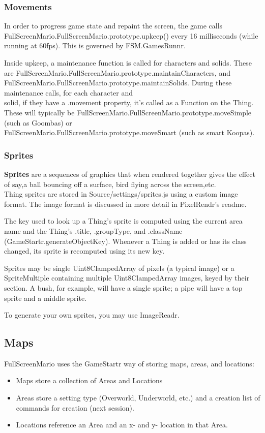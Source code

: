 \documentclass{article}
\begin{document}
\subsubsection{Movements}
In order to progress game state and repaint the screen, the game calls FullScreenMario.FullScreenMario.prototype.upkeep() every 16 milliseconds (while running at 60fps). This is governed by FSM.GamesRunnr.

Inside upkeep, a maintenance function is called for characters and solids. These are FullScreenMario.FullScreenMario.prototype.maintainCharacters, and\\ FullScreenMario.FullScreenMario.prototype.maintainSolids. During these maintenance calls, for each character and\\ solid, if they have a .movement property, it's called as a Function on the Thing. These will typically be FullScreenMario.FullScreenMario.prototype.moveSimple (such as Goombas) or\\ FullScreenMario.FullScreenMario.prototype.moveSmart (such as smart Koopas).

\subsubsection{Sprites}
\textbf{Sprites} are a sequences of  graphics that when rendered together  gives the effect of say,a ball bouncing off a surface, bird flying across the screen,etc.\\

Thing sprites are stored in Source/settings/sprites.js using a custom image format. The image format is discussed in more detail in PixelRendr's readme.

The key used to look up a Thing's sprite is computed using the current area name and the Thing's .title, .groupType, and .className (GameStartr.generateObjectKey). Whenever a Thing is added or has its class changed, its sprite is recomputed using its new key.

Sprites may be single Uint8ClampedArray of pixels (a typical image) or a SpriteMultiple containing multiple Uint8ClampedArray images, keyed by their section. A bush, for example, will have a single sprite; a pipe will have a top sprite and a middle sprite.

To generate your own sprites, you may use ImageReadr.
\subsection{Maps}
FullScreenMario uses the GameStartr way of storing maps, areas, and locations:
\begin{itemize}
\item	Maps store a collection of Areas and Locations
\item	Areas store a setting type (Overworld, Underworld, etc.) and a creation list of commands for creation (next session).
\item Locations reference an Area and an x- and y- location in that Area.
\end{itemize}
\end{document}
